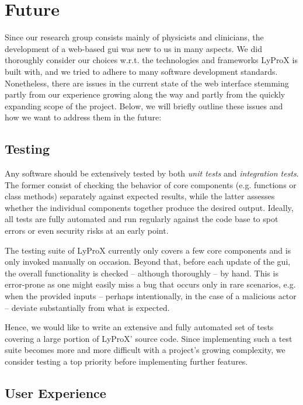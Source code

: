 \documentclass[\relativeRoot/main.tex]{subfiles}
\begin{document}
\section{Future}
\label{sec:lyprox:future}

Since our research group consists mainly of physicists and clinicians, the development of a web-based \gls{gui} was new to us in many aspects. We did thoroughly consider our choices w.r.t. the technologies and frameworks LyProX is built with, and we tried to adhere to many software development standards. Nonetheless, there are issues in the current state of the web interface stemming partly from our experience growing along the way and partly from the quickly expanding scope of the project. Below, we will briefly outline these issues and how we want to address them in the future:

\subsection*{Testing}

Any software should be extensively tested by both \emph{unit tests} and \emph{integration tests}. The former consist of checking the behavior of core components (e.g. functions or class methods) separately against expected results, while the latter assesses whether the individual components together produce the desired output. Ideally, all tests are fully automated and run regularly against the code base to spot errors or even security risks at an early point.

The testing suite of LyProX currently only covers a few core components and is only invoked manually on occasion. Beyond that, before each update of the \gls{gui}, the overall functionality is checked -- although thoroughly -- by hand. This is error-prone as one might easily miss a bug that occurs only in rare scenarios, e.g. when the provided inputs -- perhaps intentionally, in the case of a malicious actor -- deviate substantially from what is expected.

Hence, we would like to write an extensive and fully automated set of tests covering a large portion of LyProX' source code. Since implementing such a test suite becomes more and more difficult with a project's growing complexity, we consider testing a top priority before implementing further features.

\subsection*{User Experience}
\end{document}
